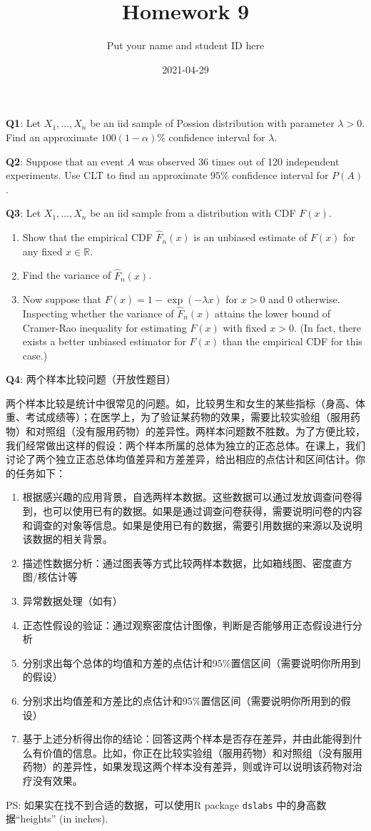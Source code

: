 \documentclass[]{article}
\title{Homework 9}
\author{Put your name and student ID here}
\date{2021-04-29}
\providecommand{\tightlist}{%
  \setlength{\itemsep}{0pt}\setlength{\parskip}{0pt}}
\begin{document}
\maketitle

\textbf{Q1}: Let \(X_1,\dots,X_n\) be an iid sample of Possion
distribution with parameter \(\lambda>0\). Find an approximate
\(100(1-\alpha)\%\) confidence interval for \(\lambda\).

\textbf{Q2}: Suppose that an event \(A\) was observed 36 times out of
120 independent experiments. Use CLT to find an approximate \(95\%\)
confidence interval for \(P(A)\).

\textbf{Q3}: Let \(X_1,\dots,X_n\) be an iid sample from a distribution
with CDF \(F(x)\).

\begin{enumerate}
\def\labelenumi{(\alph{enumi})}
\item
  Show that the empirical CDF \(\hat F_n(x)\) is an unbiased estimate of
  \(F(x)\) for any fixed \(x\in\mathbb{R}\).
\item
  Find the variance of \(\hat F_n(x)\).
\item
  Now suppose that \(F(x)=1-\exp(-\lambda x)\) for \(x>0\) and \(0\)
  otherwise. Inspecting whether the variance of \(\hat F_n(x)\) attains
  the lower bound of Cramer-Rao inequality for estimating \(F(x)\) with
  fixed \(x>0\). (In fact, there exists a better unbiased estimator for
  \(F(x)\) than the empirical CDF for this case.)
\end{enumerate}

\textbf{Q4}: 两个样本比较问题（开放性题目）

两个样本比较是统计中很常见的问题。如，比较男生和女生的某些指标（身高、体重、考试成绩等）；在医学上，为了验证某药物的效果，需要比较实验组（服用药物）和对照组（没有服用药物）的差异性。两样本问题数不胜数。为了方便比较，我们经常做出这样的假设：两个样本所属的总体为独立的正态总体。在课上，我们讨论了两个独立正态总体均值差异和方差差异，给出相应的点估计和区间估计。你的任务如下：

\begin{enumerate}
\def\labelenumi{\arabic{enumi}.}
\tightlist
\item
  根据感兴趣的应用背景，自选两样本数据。这些数据可以通过发放调查问卷得到，也可以使用已有的数据。如果是通过调查问卷获得，需要说明问卷的内容和调查的对象等信息。如果是使用已有的数据，需要引用数据的来源以及说明该数据的相关背景。
\item
  描述性数据分析：通过图表等方式比较两样本数据，比如箱线图、密度直方图/核估计等
\item
  异常数据处理（如有）
\item
  正态性假设的验证：通过观察密度估计图像，判断是否能够用正态假设进行分析
\item
  分别求出每个总体的均值和方差的点估计和95\%置信区间（需要说明你所用到的假设）
\item
  分别求出均值差和方差比的点估计和95\%置信区间（需要说明你所用到的假设）
\item
  基于上述分析得出你的结论：回答这两个样本是否存在差异，并由此能得到什么有价值的信息。比如，你正在比较实验组（服用药物）和对照组（没有服用药物）的差异性，如果发现这两个样本没有差异，则或许可以说明该药物对治疗没有效果。
\end{enumerate}

PS: 如果实在找不到合适的数据，可以使用R package \texttt{dslabs}
中的身高数据``heights'' (in inches).
\end{document}
